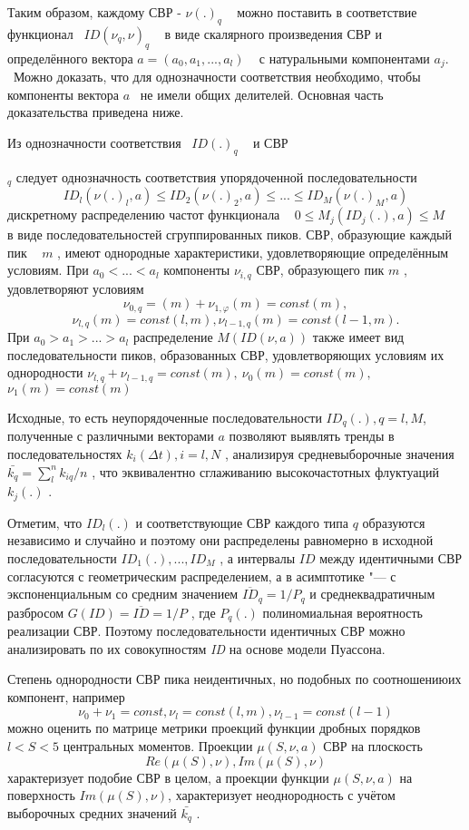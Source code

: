 {{{{ Таким образом, каждому СВР - }$\nu(.)_{q}${ ~ можно
поставить в соответствие функционал ~}$ID(\nu_{q},\nu)_{q}${ ~ в виде
скалярного произведения СВР и определённого вектора }$a=(a_{0},a_{1},...,a_{l})${ ~ с натуральными компонентами }$a_{j}${. ~Можно доказать, что для однозначности соответствия необходимо, чтобы
компоненты вектора  }{ $a$}{ ~не имели общих делителей. Основная часть
доказательства приведена ниже.}

{ Из однозначности соответствия ~}$ID(.)_{q}${ ~ и
СВР}{ $_{q}${  следует однозначность
соответствия упорядоченной последовательности}
\[
ID_{l}(\nu(.)_{l},a)\leq ID_{2}(\nu(.)_{2},a)\leq...\leq ID_{M}(\nu(.)_{M},a)
\]
{ дискретному распределению частот функционала ~ }$0\leq M_{j}(ID_{j}(.),a)\leq M${ ~ в виде последовательностей
 сгруппированных пиков. СВР,
образующие каждый пик ~}{ $m$}{ , имеют однородные характеристики,
удовлетворяющие определённым условиям. При }$a_{0}<...<a_{l}${
компоненты }$\nu_{i,q}${  СВР, образующего пик }{
$m$}{ , удовлетворяют условиям }
\[
\nu_{0,q}=(m)+\nu_{1,\varphi}(m)=const(m),
\]
\[
\nu_{l,q}(m)=const(l,m), \nu_{l-1,q}(m)=const(l-1,m).
\]
{ При }$a_{0}>a_{1}>...>a_{l}${  распределение }$M(ID(\nu,a))${  также имеет вид последовательности пиков, образованных
СВР, удовлетворяющих условиям их однородности }
$ \nu_{l,q}+\nu_{l-1,q}=const(m), ~
 \nu_{0}(m)=const(m),   $
{  }
 $ \nu_{1}(m)=const(m) $

{ Исходные, то есть неупорядоченные последовательности }$ID_{q}(.),  q=l,M${,
полученные с различными векторами  }{ $a$}{  позволяют выявлять тренды в
последовательностях  }$k_{i}(\Delta t),  i=l,N${ , анализируя средневыборочные
значения }$\bar{k_{q}}=\sum\limits_{l}^n k_{iq}/n${ , что эквивалентно сглаживанию
высокочастотных флуктуаций }$k_{j}(.)${ .}

{ Отметим, что }$ID_{l}(.)${  и соответствующие СВР
каждого типа  }{ $q$}{ образуются независимо и случайно и поэтому
они распределены равномерно в исходной последовательности }$ID_{1}(.),...,ID_{M}${ ,  а интервалы
}$ID${  между
идентичными СВР согласуются с геометрическим распределением, а в асимптотике
"--- с экспоненциальным со средним значением  }
$\overline{ID}_{q}=1/P_{q}$
{  и
среднеквадратичным разбросом  }$G(ID)=\overline{ID}=1/P${ , где }$P_{q}(.)${
полиномиальная вероятность реализации СВР. Поэтому
последовательности идентичных СВР можно анализировать по их совокупностям
}{ \textit{ID}}{   на основе модели Пуассона.}

{ Степень однородности СВР пика неидентичных, но подобных по
соотношениюих компонент, например}
\[
\nu_{0}+\nu_{1}=const, \nu_{l}=const(l,m), \nu_{l-1}=const(l-1)
\]
{ можно оценить по матрице метрики проекций функции дробных
порядков  }$l<S<5${  центральных моментов. Проекции }$\mu(S,\nu,a)${  СВР на плоскость}
\[
Re(\mu(S),\nu), Im(\mu(S),\nu)
\]
{ характеризует подобие СВР в целом, а проекции функции  }$\mu(S,\nu,a)${
на поверхность }$Im(\mu(S),\nu)$, {
характеризует неоднородность с учётом выборочных средних значений }$\bar{k_{q}}${ .}

}}}}
